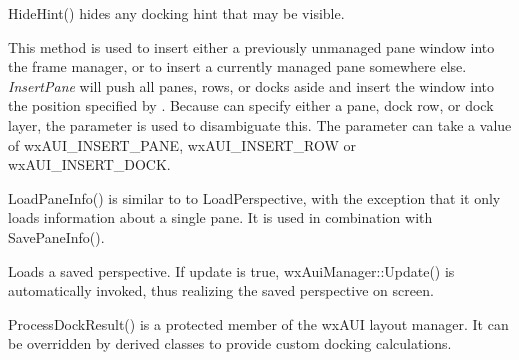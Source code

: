 \label{wxauimanagerhidehint}


HideHint() hides any docking hint that may be visible.

\label{wxauimanagerinsertpane}


This method is used to insert either a previously unmanaged pane window
into the frame manager, or to insert a currently managed pane somewhere 
else. {\it InsertPane} will push all panes, rows, or docks aside and
insert the window into the position specified by . 
Because  can specify either a pane, dock row, or dock
layer, the  parameter is used to disambiguate this. The
parameter  can take a value of wxAUI\_INSERT\_PANE, wxAUI\_INSERT\_ROW 
or wxAUI\_INSERT\_DOCK.

\label{wxauimanagerloadpaneinfo}


LoadPaneInfo() is similar to to LoadPerspective, with the exception that it only loads information about a single pane.  It is used in combination with SavePaneInfo().

\label{wxauimanagerloadperspective}


Loads a saved perspective. If update is true, wxAuiManager::Update()
is automatically invoked, thus realizing the saved perspective on screen.

\label{wxauimanagerprocessdockresult}


ProcessDockResult() is a protected member of the wxAUI layout manager.  It can be overridden by derived classes to provide custom docking calculations.

\label{wxauimanagersavepaneinfo}


